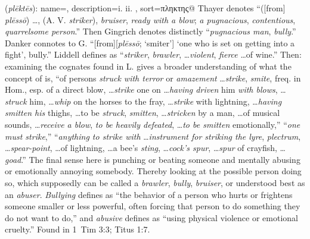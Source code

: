 \item[Abuser,]

(\textit{plēktēs}):
{
    name=,
    description={i.  ii. },
    sort=πληκτης@
}
Thayer denotes ``([from] \emph{plēssō}) \ldots, (A. V. \emph{striker}), \emph{bruiser}, \emph{ready with a blow}; \emph{a pugnacious}, \emph{contentious}, \emph{quarrelsome person}.'' 
Then Gingrich denotes distinctly ``\emph{pugnacious man}, \emph{bully}.'' 
Danker connotes to G. ``[from][\emph{plēssō}; `smiter'] `one who is set on getting into a fight', bully.'' 
Liddell defines  as ``\emph{striker}, \emph{brawler}, \ldots \emph{violent}, \emph{fierce} \ldots of wine.'' 
Then: examining the cognates found in L. gives a broader understanding of what the concept of  is,
 ``of persons \emph{struck with terror} or \emph{amazement} \ldots \emph{strike}, \emph{smite}, freq. in Hom., esp. of a direct blow, \ldots \emph{strike} one on \ldots \emph{having driven} him \emph{with blows}, \ldots \emph{struck} him, \ldots \emph{whip} on the horses to the fray, \ldots \emph{strike} with lightning, \ldots \emph{having smitten his} thighs, \ldots to be \emph{struck}, \emph{smitten}, \ldots \emph{stricken} by a man, \ldots of musical sounds, \ldots \emph{receive a blow}, \emph{to be heavily defeated}, \ldots \emph{to be smitten} emotionally,''
 ``\emph{one must strike},'' 
 ``\emph{anything to strike with} \ldots \emph{instrument for striking the lyre}, \emph{plectrum}, \ldots \emph{spear-point}, \ldots of lightning, \ldots a bee's \emph{sting}, \ldots \emph{cock's spur}, \ldots \emph{spur} of crayfish, \ldots \emph{goad}.''
The final sense here is punching or beating someone and mentally abusing or emotionally annoying somebody. Thereby looking at the possible person doing so, which supposedly can be called a \emph{brawler}, \emph{bully}, \emph{bruiser}, or understood best as an \emph{abuser}. \emph{Bullying} defines as ``the behavior of a person who hurts or frightens someone smaller or less powerful, often forcing that person to do something they do not want to do,'' and \emph{abusive} defines as ``using physical violence or emotional cruelty.''
Found in 1~Tim 3:3; Titus 1:7.
